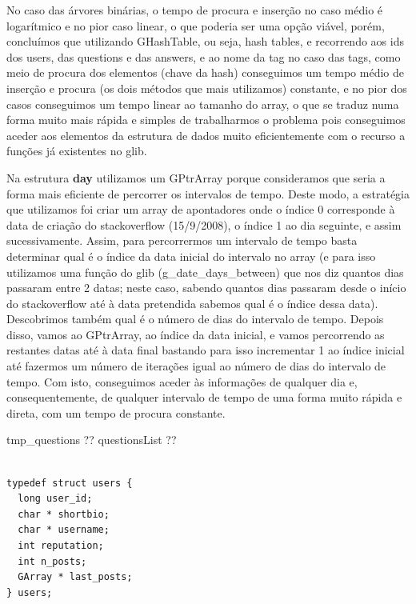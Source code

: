 \documentclass[a4paper]{report}
\begin{document}
No caso das árvores binárias, o tempo de procura e inserção no caso médio
é logarítmico  e no pior caso linear, o que poderia ser uma opção viável,
porém, concluímos que utilizando GHashTable, ou seja, hash tables, e
recorrendo aos ids dos users, das questions e das answers, e ao nome da tag
no caso das tags, como meio de procura dos elementos (chave da hash)
conseguimos um tempo médio de inserção e procura (os dois métodos que
mais utilizamos) constante, e no pior dos casos conseguimos um tempo linear
ao tamanho do array, o que se traduz numa forma muito mais rápida e
simples de trabalharmos o problema pois conseguimos aceder aos elementos da
estrutura de dados muito eficientemente com o
recurso a funções já existentes no glib.

\vspace{0.4cm}

Na estrutura \textbf{day} utilizamos um GPtrArray porque consideramos que seria
a forma mais eficiente de percorrer os intervalos de tempo. Deste modo,
a estratégia que utilizamos foi criar um array de apontadores onde o
índice 0 corresponde à data de criação do stackoverflow (15/9/2008),
o índice 1 ao dia seguinte, e assim sucessivamente. Assim, para percorrermos
um intervalo de tempo basta determinar qual é o índice da data inicial do
intervalo no array (e para isso utilizamos uma função do glib
(g\_date\_days\_between) que nos diz quantos dias passaram entre 2 datas;
neste caso, sabendo quantos dias passaram desde o início do stackoverflow
até à data pretendida
sabemos qual é o índice dessa data). Descobrimos também qual é o número de
dias do intervalo de tempo. Depois disso, vamos ao GPtrArray, ao índice da
data inicial, e vamos percorrendo as restantes datas até à data final
bastando para isso incrementar 1 ao índice inicial até fazermos
um número de iterações igual ao número de dias do intervalo de tempo.
Com isto, conseguimos aceder às informações de qualquer dia e, consequentemente,
de qualquer intervalo de tempo de uma forma muito rápida e direta,
com um tempo de procura constante.

\vspace{1cm}

tmp\_questions ??
questionsList ??



\begin{verbatim}

typedef struct users {
  long user_id;
  char * shortbio;
  char * username;
  int reputation;
  int n_posts;
  GArray * last_posts;
} users;

\end{verbatim}
\end{document}
